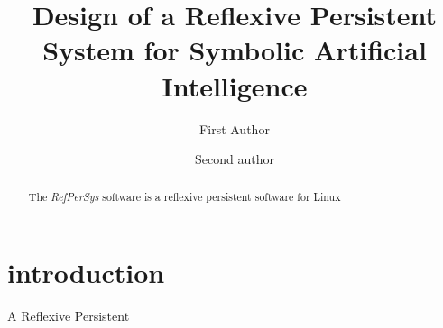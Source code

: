 \documentclass{svproc}
\begin{document}
\mainmatter              %
%
\title{Design of a Reflexive Persistent System for Symbolic Artificial Intelligence}
\author{First Author \and Second author}


\maketitle

\begin{abstract}
  The \textit{RefPerSys} software is a reflexive persistent software for Linux
\end{abstract}

\section{introduction}

A Reflexive Persistent
\end{document}
